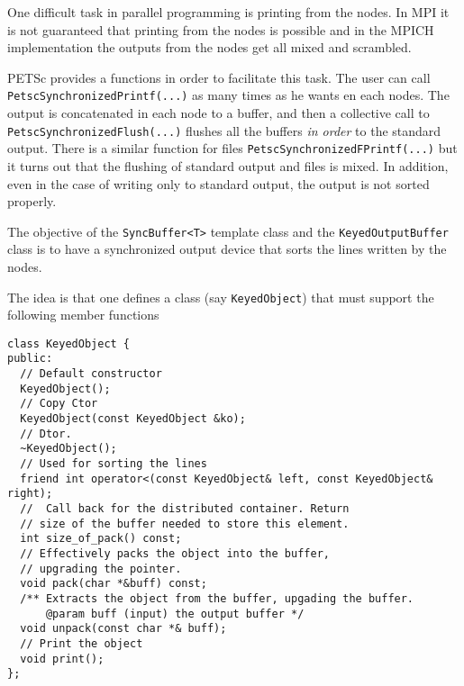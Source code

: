 
One difficult task in parallel programming is printing from the
nodes. In MPI it is not guaranteed that printing from the nodes is
possible and in the MPICH implementation the outputs from the nodes
get all mixed and scrambled. 

PETSc provides a functions in order to facilitate this task. 
The user can call \verb+PetscSynchronizedPrintf(...)+ as many times as
he wants en each nodes. The output is concatenated in each node to a
buffer, and then a collective call to
\verb+PetscSynchronizedFlush(...)+ flushes all the buffers \emph{in
  order} to the standard output. There is a similar function for
files \verb+PetscSynchronizedFPrintf(...)+ but it turns out that the
flushing of standard output and files is mixed. In addition, even in
the case of writing only to standard output, the output is not sorted
properly. 

The objective of the \verb+SyncBuffer<T>+ template class and the
\verb+KeyedOutputBuffer+ class is to have a synchronized output device
that sorts the lines written by the nodes. 

The idea is that one defines a class (say \verb+KeyedObject+) that
must support the following member functions

\begin{verbatim}
class KeyedObject {
public:
  // Default constructor 
  KeyedObject();
  // Copy Ctor
  KeyedObject(const KeyedObject &ko);
  // Dtor.
  ~KeyedObject();
  // Used for sorting the lines
  friend int operator<(const KeyedObject& left, const KeyedObject& right);
  //  Call back for the distributed container. Return
  // size of the buffer needed to store this element.
  int size_of_pack() const;
  // Effectively packs the object into the buffer, 
  // upgrading the pointer. 
  void pack(char *&buff) const;
  /** Extracts the object from the buffer, upgading the buffer. 
      @param buff (input) the output buffer */ 
  void unpack(const char *& buff);
  // Print the object
  void print();
};
\end{verbatim}




